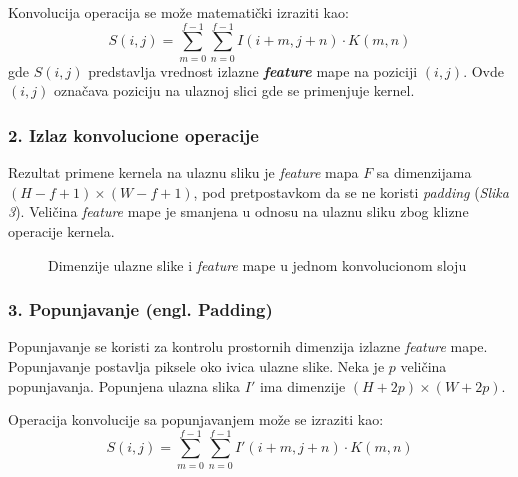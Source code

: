 \documentclass[12pt]{article}
\begin{document}
   Konvolucija operacija se može matematički izraziti kao:
   \[
   S(i, j) = \sum_{m=0}^{f-1} \sum_{n=0}^{f-1} I(i+m, j+n) \cdot K(m, n)
   \]
   gde \( S(i, j) \) predstavlja vrednost izlazne \textbf{\textit{feature}} mape na poziciji 
   \((i, j)\). Ovde \( (i, j) \) označava poziciju na ulaznoj slici gde se primenjuje kernel.

   \subsubsection*{2. Izlaz konvolucione operacije}
   Rezultat primene kernela na ulaznu sliku je \textit{feature} mapa \( F \) 
   sa dimenzijama \((H - f + 1) \times (W - f + 1)\), pod pretpostavkom da se ne 
   koristi \textit{padding} (\textit{Slika 3}). Veličina \textit{feature} mape je 
   smanjena u odnosu na ulaznu sliku zbog klizne operacije kernela.

   \newpage   

   \begin{figure}[h!]
      \centering
      \caption{Dimenzije ulazne slike i \textit{feature} mape u jednom konvolucionom sloju}
      \label{fig:convolution}
    \end{figure}

    \subsubsection*{3. Popunjavanje (engl. Padding)}

    Popunjavanje se koristi za kontrolu prostornih dimenzija izlazne \textit{feature} mape. 
    Popunjavanje postavlja piksele oko ivica ulazne slike. 
    Neka je \( p \) veličina popunjavanja. 
    Popunjena ulazna slika \( I' \) ima dimenzije \((H + 2p) \times (W + 2p)\).
    
    Operacija konvolucije sa popunjavanjem može se izraziti kao:
    \[
    S(i, j) = \sum_{m=0}^{f-1} \sum_{n=0}^{f-1} I'(i+m, j+n) \cdot K(m, n)
    \]
\end{document}
